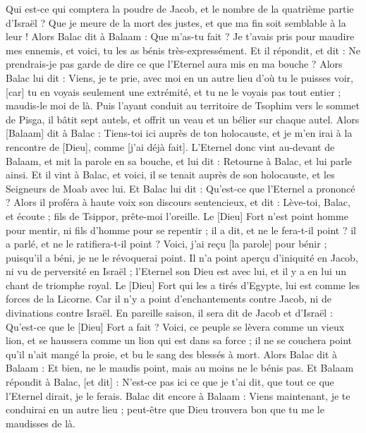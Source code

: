 \begin{multicols}{2}
Qui est-ce qui comptera la poudre de Jacob, et le nombre de la quatrième partie d'Israël ? Que je meure de la mort des justes, et que ma fin soit semblable à la leur !
Alors Balac dit à Balaam : Que m'as-tu fait ? Je t'avais pris pour maudire mes ennemis, et voici, tu les as bénis très-expressément.
Et il répondit, et dit : Ne prendrais-je pas garde de dire ce que l'Eternel aura mis en ma bouche ?
Alors Balac lui dit : Viens, je te prie, avec moi en un autre lieu d'où tu le puisses voir, [car] tu en voyais seulement une extrémité, et tu ne le voyais pas tout entier ; maudis-le moi de là.
Puis l'ayant conduit au territoire de Tsophim vers le sommet de Pisga, il bâtit sept autels, et offrit un veau et un bélier sur chaque autel.
Alors [Balaam] dit à Balac : Tiens-toi ici auprès de ton holocauste, et je m'en irai à la rencontre de [Dieu], comme [j'ai déjà fait].
L'Eternel donc vint au-devant de Balaam, et mit la parole en sa bouche, et lui dit : Retourne à Balac, et lui parle ainsi.
Et il vint à Balac, et voici, il se tenait auprès de son holocauste, et les Seigneurs de Moab avec lui. Et Balac lui dit : Qu'est-ce que l'Eternel a prononcé ?
Alors il proféra à haute voix son discours sentencieux, et dit : Lève-toi, Balac, et écoute ; fils de Tsippor, prête-moi l'oreille.
Le [Dieu] Fort n'est point homme pour mentir, ni fils d'homme pour se repentir ; il a dit, et ne le fera-t-il point ? il a parlé, et ne le ratifiera-t-il point ?
Voici, j'ai reçu [la parole] pour bénir ; puisqu'il a béni, je ne le révoquerai point.
Il n'a point aperçu d'iniquité en Jacob, ni vu de perversité en Israël ; l'Eternel son Dieu est avec lui, et il y a en lui un chant de triomphe royal.
Le [Dieu] Fort qui les a tirés d'Egypte, lui est comme les forces de la Licorne.
Car il n'y a point d'enchantements contre Jacob, ni de divinations contre Israël. En pareille saison, il sera dit de Jacob et d'Israël : Qu'est-ce que le [Dieu] Fort a fait ?
Voici, ce peuple se lèvera comme un vieux lion, et se haussera comme un lion qui est dans sa force ; il ne se couchera point qu'il n'ait mangé la proie, et bu le sang des blessés à mort.
Alors Balac dit à Balaam : Et bien, ne le maudis point, mais au moins ne le bénis pas.
Et Balaam répondit à Balac, [et dit] : N'est-ce pas ici ce que je t'ai dit, que tout ce que l'Eternel dirait, je le ferais.
Balac dit encore à Balaam : Viens maintenant, je te conduirai en un autre lieu ; peut-être que Dieu trouvera bon que tu me le maudisses de là.

\end{multicols}
